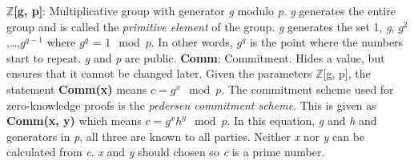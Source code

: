 \documentclass[a4paper]{article}
\begin{document}
  \newline
  \indent $\mathbb{Z}$\textbf{[g, p]}: Multiplicative group with generator \emph{g} modulo \emph{p}. \emph{g} generates the entire group and is called the \emph{primitive element} of the group. \emph{g} generates the set 1, \emph{g}, \emph{$g^2$},\dots,\emph{$g^{q-1}$} where \emph{$g^q$} = $1\mod{p}$. In other words, \emph{$g^q$} is the point where the numbers start to repeat. \emph{g} and \emph{p} are public.\newline
  \newline
  \indent \textbf{Comm}: Commitment. Hides a value, but ensures that it cannot be changed later. Given the parameters $\mathbb{Z}$[g, p], the statement \textbf{Comm(x)} means  $c=g^x\mod{p}$. The commitment scheme used for zero-knowledge proofs is the \emph{pedersen commitment scheme}. This is given as \textbf{Comm(x, y)} which means $c=g^xh^y\mod{p}$. In this equation, \emph{g} and \emph{h} and generators in \emph{p}, all three are known to all parties. Neither \emph{x} nor \emph{y} can be calculated from \emph{c}. \emph{x} and \emph{y} should chosen so \emph{c} is a prime number.\newline
  \newline
  
  
\end{document}

